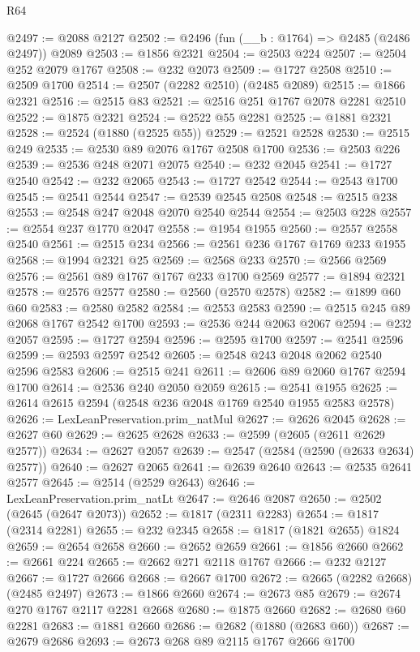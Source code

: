 \begin{lexlean}{R64}
\begin{coremodule}
@2497 := @2088 @2127
@2502 := @2496 (fun (__b : @1764) => @2485 (@2486 @2497)) @2089
@2503 := @1856 @2321
@2504 := @2503 @224
@2507 := @2504 @252 @2079 @1767
@2508 := @232 @2073
@2509 := @1727 @2508
@2510 := @2509 @1700
@2514 := @2507 (@2282 @2510) (@2485 @2089)
@2515 := @1866 @2321
@2516 := @2515 @83
@2521 := @2516 @251 @1767 @2078 @2281 @2510
@2522 := @1875 @2321
@2524 := @2522 @55 @2281
@2525 := @1881 @2321
@2528 := @2524 (@1880 (@2525 @55))
@2529 := @2521 @2528
@2530 := @2515 @249
@2535 := @2530 @89 @2076 @1767 @2508 @1700
@2536 := @2503 @226
@2539 := @2536 @248 @2071 @2075
@2540 := @232 @2045
@2541 := @1727 @2540
@2542 := @232 @2065
@2543 := @1727 @2542
@2544 := @2543 @1700
@2545 := @2541 @2544
@2547 := @2539 @2545 @2508
@2548 := @2515 @238
@2553 := @2548 @247 @2048 @2070 @2540 @2544
@2554 := @2503 @228
@2557 := @2554 @237 @1770 @2047
@2558 := @1954 @1955
@2560 := @2557 @2558 @2540
@2561 := @2515 @234
@2566 := @2561 @236 @1767 @1769 @233 @1955
@2568 := @1994 @2321 @25
@2569 := @2568 @233
@2570 := @2566 @2569
@2576 := @2561 @89 @1767 @1767 @233 @1700 @2569
@2577 := @1894 @2321
@2578 := @2576 @2577
@2580 := @2560 (@2570 @2578)
@2582 := @1899 @60 @60
@2583 := @2580 @2582
@2584 := @2553 @2583
@2590 := @2515 @245 @89 @2068 @1767 @2542 @1700
@2593 := @2536 @244 @2063 @2067
@2594 := @232 @2057
@2595 := @1727 @2594
@2596 := @2595 @1700
@2597 := @2541 @2596
@2599 := @2593 @2597 @2542
@2605 := @2548 @243 @2048 @2062 @2540 @2596 @2583
@2606 := @2515 @241
@2611 := @2606 @89 @2060 @1767 @2594 @1700
@2614 := @2536 @240 @2050 @2059
@2615 := @2541 @1955
@2625 := @2614 @2615 @2594 (@2548 @236 @2048 @1769 @2540 @1955 @2583 @2578)
@2626 := LexLeanPreservation.prim_natMul
@2627 := @2626 @2045
@2628 := @2627 @60
@2629 := @2625 @2628
@2633 := @2599 (@2605 (@2611 @2629 @2577))
@2634 := @2627 @2057
@2639 := @2547 (@2584 (@2590 (@2633 @2634) @2577))
@2640 := @2627 @2065
@2641 := @2639 @2640
@2643 := @2535 @2641 @2577
@2645 := @2514 (@2529 @2643)
@2646 := LexLeanPreservation.prim_natLt
@2647 := @2646 @2087
@2650 := @2502 (@2645 (@2647 @2073))
@2652 := @1817 (@2311 @2283)
@2654 := @1817 (@2314 @2281)
@2655 := @232 @2345
@2658 := @1817 (@1821 @2655) @1824
@2659 := @2654 @2658
@2660 := @2652 @2659
@2661 := @1856 @2660
@2662 := @2661 @224
@2665 := @2662 @271 @2118 @1767
@2666 := @232 @2127
@2667 := @1727 @2666
@2668 := @2667 @1700
@2672 := @2665 (@2282 @2668) (@2485 @2497)
@2673 := @1866 @2660
@2674 := @2673 @85
@2679 := @2674 @270 @1767 @2117 @2281 @2668
@2680 := @1875 @2660
@2682 := @2680 @60 @2281
@2683 := @1881 @2660
@2686 := @2682 (@1880 (@2683 @60))
@2687 := @2679 @2686
@2693 := @2673 @268 @89 @2115 @1767 @2666 @1700

\end{coremodule}
\end{lexlean}
